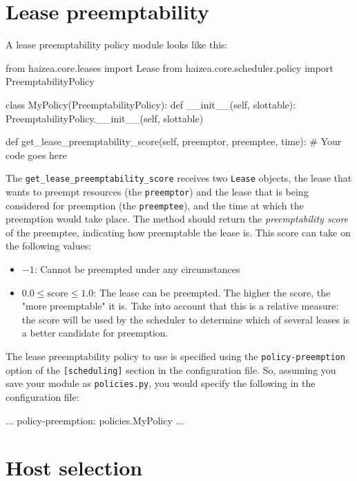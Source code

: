 \section{Lease preemptability}

A lease preemptability policy module looks like this:

\begin{wideshellverbatim}
from haizea.core.leases import Lease
from haizea.core.scheduler.policy import PreemptabilityPolicy

class MyPolicy(PreemptabilityPolicy):
    def __init__(self, slottable):
        PreemptabilityPolicy.__init__(self, slottable)
    
    def get_lease_preemptability_score(self, preemptor, preemptee, time):
        # Your code goes here
\end{wideshellverbatim}

The \texttt{get\_lease\_preemptability\_score} receives two \texttt{Lease} objects, the lease that wants to preempt resources (the \texttt{preemptor}) and the lease that is being considered for preemption (the \texttt{preemptee}), and the time at which the preemption would take place. The method should return the \emph{preemptability score} of the preemptee, indicating how preemptable the lease is. This score can take on the following values:

\begin{itemize}
 \item $-1$: Cannot be preempted under any circumstances
 \item $0.0 \leq \textrm{score} \leq 1.0$: The lease can be preempted. The higher the score, the "more preemptable" it is. Take into account that this is a relative measure: the score will be used by the scheduler to determine which of several leases is a better candidate for preemption.
\end{itemize}

The lease preemptability policy to use is specified using the \texttt{policy-preemption} option of the \texttt{[scheduling]} section in the configuration file. So, assuming you save your module as \texttt{policies.py}, you would specify the following in the configuration file:

\begin{wideshellverbatim}
[scheduling]
...
policy-preemption: policies.MyPolicy
...
\end{wideshellverbatim}

\section{Host selection}

